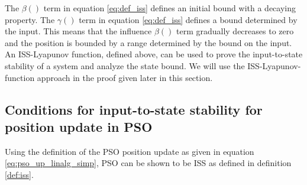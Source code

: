 The $ \beta () $ term in equation \eqref{eq:def_iss} defines an initial bound with a decaying property.
The $ \gamma () $ term in equation \eqref{eq:def_iss} defines a bound determined by the input.
This means that the influence $ \beta () $ term gradually decreases to zero and the position is bounded by a range determined by the bound on the input.
An ISS-Lyapunov function, defined above, can be used to prove the input-to-state stability of a system and analyze the state bound\cite{Jiang2001857}.
We will use the ISS-Lyapunov-function approach in the proof given later in this section.

\subsection{Conditions for input-to-state stability for position update in PSO}

Using the definition of the PSO position update as given in equation \eqref{eq:pso_up_linalg_simp}, PSO can be shown to be ISS as defined in definition \ref{def:iss}.

